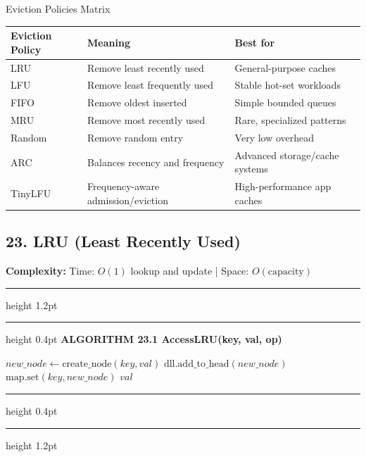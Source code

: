\documentclass[11pt,a4paper]{article}
\newenvironment{textbookalgo}[2]{%
  \par\addvspace{1.2em}\noindent
  \hrule height 1.2pt
  \vspace{1.5pt}
  \hrule height 0.4pt
  \vspace{5pt}
  {\noindent\large\bfseries\sffamily ALGORITHM #1 \quad #2}
  \par\vspace{5pt}
  \RestyleAlgo{plain}
}{%
  \par\vspace{4pt}
  \hrule height 0.4pt
  \vspace{1.5pt}
  \hrule height 1.2pt
  \par\addvspace{1.2em}
}
\theoremstyle{definition}
\begin{document}
\begin{infobox}{Eviction Policies Matrix}
\small
\centering
\begin{tabularx}{\textwidth}{lXX}
\toprule
\textbf{Eviction Policy} & \textbf{Meaning} & \textbf{Best for} \\
\midrule
LRU & Remove least recently used & General-purpose caches \\
\addlinespace
LFU & Remove least frequently used & Stable hot-set workloads \\
\addlinespace
FIFO & Remove oldest inserted & Simple bounded queues \\
\addlinespace
MRU & Remove most recently used & Rare, specialized patterns \\
\addlinespace
Random & Remove random entry & Very low overhead \\
\addlinespace
ARC & Balances recency and frequency & Advanced storage/cache systems \\
\addlinespace
TinyLFU & Frequency-aware admission/eviction & High-performance app caches \\
\bottomrule
\end{tabularx}
\end{infobox}

\clearpage
\subsection{23. LRU (Least Recently Used)}

\noindent
\textbf{Complexity:} Time: $O(1)$ lookup and update | Space: $O(\text{capacity})$
\smallskip

\begin{textbookalgo}{23.1}{AccessLRU(key, val, op)}
\begin{algorithm}[H]
$new\_node \leftarrow \text{create\_node}(key, val)$\;
$\text{dll.add\_to\_head}(new\_node)$\;
$\text{map.set}(key, new\_node)$\;
\Return $val$\;
\end{algorithm}
\end{textbookalgo}
\end{document}
